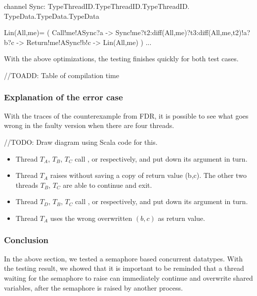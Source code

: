 \documentclass{article}
\begin{document}
\begin{cspinline}{}{}
channel Sync: TypeThreadID.TypeThreadID.TypeThreadID.
              TypeData.TypeData.TypeData

Lin(All,me)= (
  Call!me!ASync?a ->
  Sync!me?t2:diff(All,{me})?t3:diff(All,{me,t2})!a?b?c ->
  Return!me!ASync!b!c ->
  Lin(All,me)
) ...
\end{cspinline}

With the above optimizations, the testing finishes quickly for both test cases.

//TOADD: Table of compilation time

\subsubsection{Explanation of the error case}
With the traces of the counterexample from FDR, it is possible to see what goes wrong in the faulty version when there are four threads.

//TODO: Draw diagram using Scala code for this.
\begin{itemize}
  \item Thread $T_A$, $T_B$, $T_C$ call ,  or  respectively, and put down its argument in turn.
  \item Thread $T_A$ raises  without saving a copy of   return value {(b,c)}. The other two threads $T_B$, $T_C$ are able   to continue and exit. 
  \item Thread $T_D$, $T_B$, $T_C$ call ,  or  respectively, and put down its argument in turn.
  \item Thread $T_A$ uses the wrong overwritten $(b,c)$ as return value. 
  
\end{itemize}

\subsubsection{Conclusion}
In the above section, we tested a semaphore based concurrent datatypes. With the testing result, we showed that it is important to be reminded that a thread waiting for the semaphore to raise can immediately continue and overwrite shared variables, after the semaphore is raised by another process.
\end{document}
